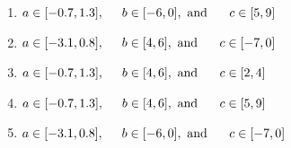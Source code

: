 \documentclass[14pt]{extbook}
\begin{document}
\begin{enumerate}
{\begin{center}
\end{center}
\begin{enumerate}[label=\Alph*.]
\item \( a \in [-0.7, 1.3], \hspace*{5mm} b \in [-6, 0], \text{ and } \hspace*{5mm} c \in [5, 9] \)
\item \( a \in [-3.1, 0.8], \hspace*{5mm} b \in [4, 6], \text{ and } \hspace*{5mm} c \in [-7, 0] \)
\item \( a \in [-0.7, 1.3], \hspace*{5mm} b \in [4, 6], \text{ and } \hspace*{5mm} c \in [2, 4] \)
\item \( a \in [-0.7, 1.3], \hspace*{5mm} b \in [4, 6], \text{ and } \hspace*{5mm} c \in [5, 9] \)
\item \( a \in [-3.1, 0.8], \hspace*{5mm} b \in [-6, 0], \text{ and } \hspace*{5mm} c \in [-7, 0] \)


\end{enumerate}}
\end{enumerate}
\end{document}
